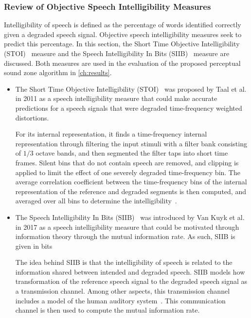 \subsubsection{Review of Objective Speech Intelligibility Measures}
Intelligibility of speech is defined as the percentage of words identified correctly given a degraded speech signal.
Objective speech intelligibility measures seek to predict this percentage.
In this section, the Short Time Objective Intelligibility (STOI)~\cite{taal2011algorithm} measure and the 
Speech Intelligibility In Bits (SIIB)~\cite{van2017instrumental} measure are discussed.
Both measures are used in the evaluation of the proposed perceptual sound zone algorithm in \autoref{ch:results}.

\begin{itemize}
    \item 
    The Short Time Objective Intelligibility (STOI)~\cite{taal2011algorithm} was proposed by Taal et al. 
    in 2011 as a speech intelligibility measure that could make accurate predictions 
    for a speech signals that were degraded time-frequency weighted distortions.

    For its internal representation, it finds a time-frequency internal representation through filtering 
    the input stimuli with a filter bank consisting of 
    $1/3$ octave bands, and then segmented the filter taps into short time frames.
    Silent bins that do not contain speech are removed, and clipping is applied to limit the 
    effect of one severely degraded time-frequency bin.
    The average correlation coefficient between the time-frequency bins of the internal 
    representation of the reference and degraded 
    segments is then computed, and averaged over all bins to determine the intelligibility~\cite{taal2011algorithm}.

    \item 
    The Speech Intelligibility In Bits (SIIB)~\cite{van2017instrumental} was introduced by Van Kuyk et al.
    in 2017 as a speech intelligibility measure that could be motivated through
    information theory through the mutual information rate.
    As such, SIIB is given in bits

    The idea behind SIIB is that the intelligibility of speech is related to the information shared between 
    intended and degraded speech.
    SIIB models how transformation of the reference speech signal to the degraded speech signal as a transmission channel.
    Among other aspects, this transmission channel includes a model of the human auditory system~\cite{van2017instrumental}.
    This communication channel is then used to compute the mutual information rate.
\end{itemize}

